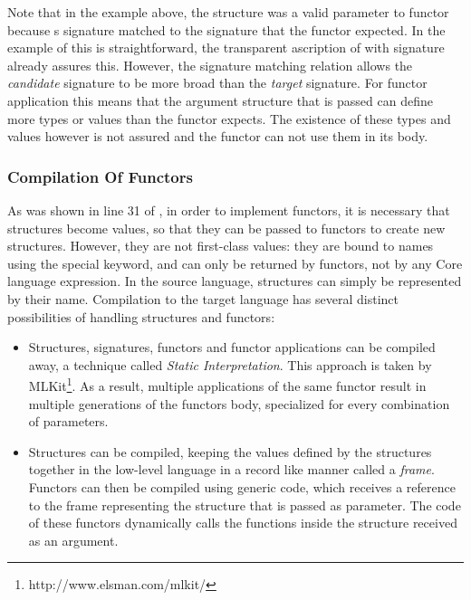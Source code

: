 \documentclass[10pt,a4paper,master=cws, masteroption=ai,english,inputenc=utf8]{kulemt}
\begin{document}
\noindent Note that in the example above, the structure  was a valid parameter to functor  because s signature matched to the  signature that the functor expected. In the example of  this is straightforward, the transparent ascription of  with signature  already assures this.
However, the signature matching relation allows the \emph{candidate} signature to be more broad than the \emph{target} signature.
For functor application this means that the argument structure that is passed can define more types or values than the functor expects.
The existence of these types and values however is not assured and the functor can not use them in its body.

\smallskip
\subsubsection{Compilation Of Functors}
\noindent As was shown in line 31 of , in order to implement functors, it is necessary that structures become values, so that they can be passed to functors to create new structures. 
However, they are not first-class values: they are bound to names using the special  keyword, and can only be returned by functors, not by any Core language expression.
In the source language, structures can simply be represented by their name.
Compilation to the target language has several distinct possibilities of handling structures and functors:
\begin{itemize}
    \item Structures, signatures, functors and functor applications can be compiled away, a technique called \emph{Static Interpretation}.\cite{Elsman}
    This approach is taken by MLKit\footnote{http://www.elsman.com/mlkit/}.
    As a result, multiple applications of the same functor result in multiple generations of the functors body, specialized for every combination of parameters.
    \item Structures can be compiled, keeping the values defined by the structures together in the low-level language in a record like manner called a \emph{frame}.
    Functors can then be compiled using generic code, which receives a reference to the frame representing the structure that is passed as parameter.
    The code of these functors dynamically calls the functions inside the structure received as an argument.
\end{itemize}
\end{document}
